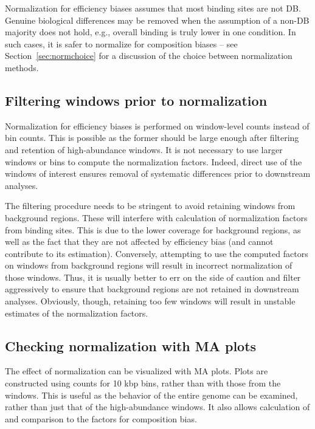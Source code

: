\documentclass{report}\usepackage[]{graphicx}\usepackage[usenames,dvipsnames]{color}
\begin{document}
Normalization for efficiency biases assumes that most binding sites are not DB.
Genuine biological differences may be removed when the assumption of a non-DB majority does not hold, e.g., overall binding is truly lower in one condition. 
In such cases, it is safer to normalize for composition biases -- see Section~\ref{sec:normchoice} for a discussion of the choice between normalization methods.

\subsection{Filtering windows prior to normalization}
Normalization for efficiency biases is performed on window-level counts instead of bin counts.
This is possible as the former should be large enough after filtering and retention of high-abundance windows.
It is not necessary to use larger windows or bins to compute the normalization factors.
Indeed, direct use of the windows of interest ensures removal of systematic differences prior to downstream analyses.

The filtering procedure needs to be stringent to avoid retaining windows from background regions.
These will interfere with calculation of normalization factors from binding sites.
This is due to the lower coverage for background regions, as well as the fact that they are not affected by efficiency bias (and cannot contribute to its estimation).
Conversely, attempting to use the computed factors on windows from background regions will result in incorrect normalization of those windows.
Thus, it is usually better to err on the side of caution and filter aggressively to ensure that background regions are not retained in downstream analyses.
Obviously, though, retaining too few windows will result in unstable estimates of the normalization factors.

\subsection{Checking normalization with MA plots}
\label{sec:eff_norm_ma}

The effect of normalization can be visualized with MA plots. 
Plots are constructed using counts for 10 kbp bins, rather than with those from the windows.
This is useful as the behavior of the entire genome can be examined, rather than just that of the high-abundance windows.
It also allows calculation of and comparison to the factors for composition bias.
\end{document}
